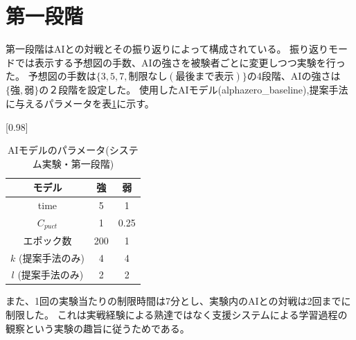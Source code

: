 \section{第一段階}
第一段階はAIとの対戦とその振り返りによって構成されている。
振り返りモードでは表示する予想図の手数、AIの強さを被験者ごとに変更しつつ実験を行った。
予想図の手数は$\{3, 5, 7, 制限なし(最後まで表示)\}$の4段階、AIの強さは$\{強,弱\}$の２段階を設定した。
使用したAIモデル(alphazero\_baseline),提案手法に与えるパラメータを表\ref{table:param-system}に示す。
\begin{table}[H]
	\caption{AIモデルのパラメータ(システム実験・第一段階)}
	\centering
	\scalebox{0.98}[0.98]{
		\begin{tabular}{c|c|c}
			モデル&強&弱\\\hline
			time    & 5 & 1 \\ 
			$C_{puct}$ & 1   & 0.25 \\
            エポック数 & 200 & 1 \\
			$k$ (提案手法のみ)     & 4 & 4 \\
			$l$ (提案手法のみ)     & 2 & 2 \\

		\end{tabular}
	}
	\label{table:param-system}
\end{table}
また、1回の実験当たりの制限時間は7分とし、実験内のAIとの対戦は2回までに制限した。
これは実戦経験による熟達ではなく支援システムによる学習過程の観察という実験の趣旨に従うためである。

